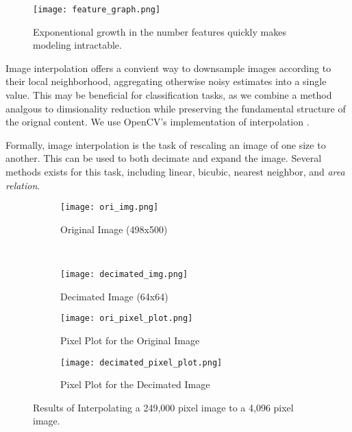 \documentclass{article}
\begin{document}
\begin{figure}
  \centering
  \texttt{[image: feature\_graph.png]}
  \vspace{-5pt}
  \caption{Exponentional growth in the number features quickly makes modeling intractable.}
  \label{fig:feature-size}
\end{figure}

Image interpolation offers a convient way to downsample images according to
their local neighborhood, aggregating otherwise noisy estimates into a single
value. This may be beneficial for classification tasks, as we combine a method
analgous to dimsionality reduction while preserving the fundamental structure of
the orignal content. We use OpenCV's implementation of interpolation \cite{opencv}.

Formally, image interpolation is the task of rescaling an image of one size
to another. This can be used to both decimate and expand the image. Several
methods exists for this task, including linear, bicubic, nearest neighbor, and
\textit{area relation}.

\begin{figure}
  \centering
  \begin{subfigure}[b]{0.45\textwidth}
    \centering
    \texttt{[image: ori\_img.png]}
    \vspace{-13pt}
    \caption{Original Image (498x500)}
    \label{fig:ori-image}
  \end{subfigure}
  ~
  \begin{subfigure}[b]{0.45\textwidth}
    \centering
    \texttt{[image: decimated\_img.png]}
    \vspace{-13pt}
    \caption{Decimated Image (64x64)}
    \label{fig:reduced-img}
  \end{subfigure}

  \begin{subfigure}[b]{1.\textwidth}
    \centering
    \texttt{[image: ori\_pixel\_plot.png]}
    \caption{Pixel Plot for the Original Image}
    \label{fig:ori-pixel-plot}
  \end{subfigure}

  \begin{subfigure}[b]{1.\textwidth}
    \centering
    \texttt{[image: decimated\_pixel\_plot.png]}
    \caption{Pixel Plot for the Decimated Image}
    \label{fig:reduced-pixel-plot}
  \end{subfigure}
  \caption{Results of Interpolating a 249,000 pixel image to a 4,096 pixel image.}
  \label{fig:interpolation}
\end{figure}
\end{document}

